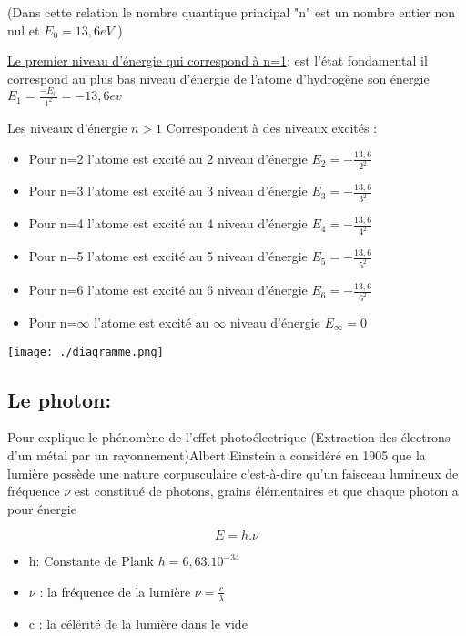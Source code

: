 \documentclass[12pt]{article}
\begin{document}
(Dans cette relation le nombre quantique principal "n" est un nombre entier non nul et $E_0=13,6eV$ )

\underline{Le premier niveau d'énergie qui correspond à n=1}: est l'état fondamental il correspond au plus bas niveau d'énergie de l'atome d'hydrogène son énergie $E_1 = \frac{-E_0}{1^2} = -13,6ev$

Les niveaux d'énergie $n > 1$ Correspondent à des niveaux excités :

\begin{itemize}
	\item Pour n=2 l'atome est excité au 2 niveau d'énergie $E_2 = -\frac{13,6}{2^2}$
	\item Pour n=3 l'atome est excité au 3 niveau d'énergie $E_3 = -\frac{13,6}{3^2}$
	\item Pour n=4 l'atome est excité au 4 niveau d'énergie $E_4 = -\frac{13,6}{4^2}$
	\item Pour n=5 l'atome est excité au 5 niveau d'énergie $E_5 = -\frac{13,6}{5^2}$
	\item Pour n=6 l'atome est excité au 6 niveau d'énergie $E_6 = -\frac{13,6}{6^2}$
	\item Pour n=$\infty$ l'atome est excité au $\infty$ niveau d'énergie $E_{\infty} = 0$
\end{itemize}

\begin{center}

	\texttt{[image: ./diagramme.png]}
\end{center}

\subsection{Le photon: }
Pour explique le phénomène de l'effet photoélectrique (Extraction des électrons d'un métal par un rayonnement)Albert Einstein a considéré en 1905 que la lumière possède une nature corpusculaire c'est-à-dire qu'un faisceau lumineux de fréquence $\nu$ est
constitué de photons, grains élémentaires et que chaque photon a pour énergie 

$$E=h.\nu$$

\begin{itemize}

	\item h: Constante de Plank $h=6,63.10^{-34}$
	\item $\nu $ : la fréquence de la lumière $\nu = \frac{c}{\lambda}$
	\item c : la célérité de la lumière  dans le vide
\end{itemize}
\end{document}
